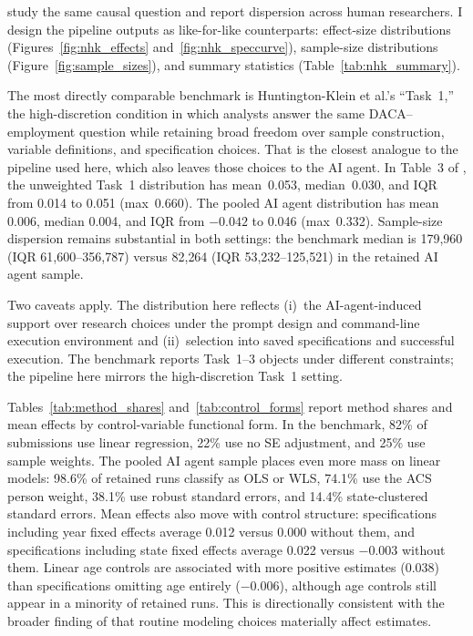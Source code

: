 \documentclass[12pt]{article}
\begin{document}
\citet{huntingtonklein2025sources} study the same causal question and report dispersion across human researchers. I design the pipeline outputs as like-for-like counterparts: effect-size distributions (Figures~\ref{fig:nhk_effects} and~\ref{fig:nhk_speccurve}), sample-size distributions (Figure~\ref{fig:sample_sizes}), and summary statistics (Table~\ref{tab:nhk_summary}).

The most directly comparable benchmark is Huntington-Klein et al.'s ``Task~1,'' the high-discretion condition in which analysts answer the same DACA--employment question while retaining broad freedom over sample construction, variable definitions, and specification choices. That is the closest analogue to the pipeline used here, which also leaves those choices to the AI agent. In Table~3 of \cite{huntingtonklein2025sources}, the unweighted Task~1 distribution has mean~0.053, median~0.030, and IQR from 0.014 to 0.051 (max~0.660). The pooled AI agent distribution has mean 0.006, median 0.004, and IQR from $-0.042$ to 0.046 (max~0.332). Sample-size dispersion remains substantial in both settings: the benchmark median is 179{,}960 (IQR 61{,}600--356{,}787) versus 82{,}264 (IQR 53{,}232--125{,}521) in the retained AI agent sample.

Two caveats apply. The distribution here reflects (i)~the AI-agent-induced support over research choices under the prompt design and command-line execution environment and (ii)~selection into saved specifications and successful execution. The benchmark reports Task~1--3 objects under different constraints; the pipeline here mirrors the high-discretion Task~1 setting.

Tables~\ref{tab:method_shares} and~\ref{tab:control_forms} report method shares and mean effects by control-variable functional form. In the benchmark, 82\% of submissions use linear regression, 22\% use no SE adjustment, and 25\% use sample weights. The pooled AI agent sample places even more mass on linear models: 98.6\% of retained runs classify as OLS or WLS, 74.1\% use the ACS person weight, 38.1\% use robust standard errors, and 14.4\% state-clustered standard errors. Mean effects also move with control structure: specifications including year fixed effects average 0.012 versus 0.000 without them, and specifications including state fixed effects average 0.022 versus $-0.003$ without them. Linear age controls are associated with more positive estimates (0.038) than specifications omitting age entirely ($-0.006$), although age controls still appear in a minority of retained runs. This is directionally consistent with the broader finding of \cite{huntingtonklein2025sources} that routine modeling choices materially affect estimates.
\end{document}
